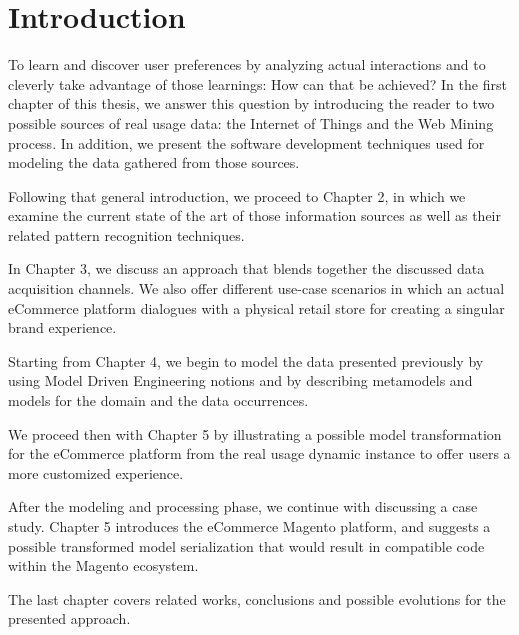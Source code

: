 
\chapter*{Introduction}

To learn and discover user preferences by analyzing actual interactions and to cleverly take advantage of those learnings: How can that be achieved? In the first chapter of this thesis, we answer this question by introducing the reader to two possible sources of real usage data: the Internet of Things and the Web Mining process. In addition, we present the software development techniques used for modeling the data gathered from those sources.

Following that general introduction, we proceed to Chapter 2, in which we examine the current state of the art of those information sources as well as their related pattern recognition techniques.

In Chapter 3, we discuss an approach that blends together the discussed data acquisition channels. We also offer different use-case scenarios in which an actual eCommerce platform dialogues with a physical retail store for creating a singular brand experience.

Starting from Chapter 4, we begin to model the data presented previously by using Model Driven Engineering notions and by describing metamodels and models for the domain and the data occurrences. 

We proceed then with Chapter 5 by illustrating a possible model transformation for the eCommerce platform from the real usage dynamic instance to offer users a more customized experience.

After the modeling and processing phase, we continue with discussing a case study. Chapter 5 introduces the eCommerce Magento platform, and suggests a possible transformed model serialization that would result in compatible code within the Magento ecosystem.

The last chapter covers related works, conclusions and possible evolutions for the presented approach.

